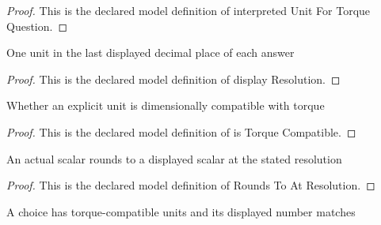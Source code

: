 \begin{proof}
  This is the declared model definition of interpreted Unit For Torque Question.
\end{proof}
\begin{definition}
  \label{def:physics:phyx-mini-0996:phyxminiproblems-problemphyxmini0996-answerchoice-displayresolution}
  One unit in the last displayed decimal place of each answer
\end{definition}
\begin{proof}
  This is the declared model definition of display Resolution.
\end{proof}
\begin{definition}
  \label{def:physics:phyx-mini-0996:phyxminiproblems-problemphyxmini0996-displayedunit-istorquecompatible}
  Whether an explicit unit is dimensionally compatible with torque
\end{definition}
\begin{proof}
  This is the declared model definition of is Torque Compatible.
\end{proof}
\begin{definition}
  \label{def:physics:phyx-mini-0996:phyxminiproblems-problemphyxmini0996-roundstoatresolution}
  An actual scalar rounds to a displayed scalar at the stated resolution
\end{definition}
\begin{proof}
  This is the declared model definition of Rounds To At Resolution.
\end{proof}
\begin{definition}
  \label{def:physics:phyx-mini-0996:phyxminiproblems-problemphyxmini0996-matchesdisplayedtorquechoice}
  A choice has torque-compatible units and its displayed number matches
\end{definition}
